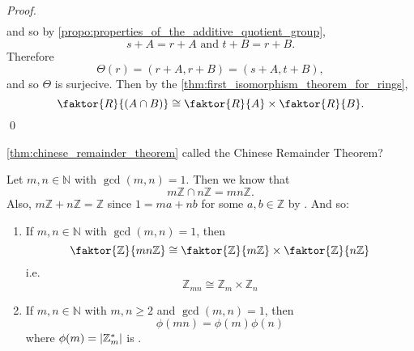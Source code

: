 \begin{proof}
\begin{align*}
  \end{align*}
  and so by \cref{propo:properties_of_the_additive_quotient_group},
  \begin{equation*}
    s + A = r + A \text{ and } t + B = r + B.
  \end{equation*}
  Therefore
  \begin{equation*}
    \Theta(r) = (r + A, r + B) = (s + A, t + B),
  \end{equation*}
  and so $\Theta$ is surjecive. Then by the \cref{thm:first_isomorphism_theorem_for_rings},
  \begin{equation*}
    \faktor{R}{(A \cap B)} \cong \faktor{R}{A} \times \faktor{R}{B}.
  \end{equation*}\qed
\end{proof}

 \cref{thm:chinese_remainder_theorem} called the Chinese Remainder Theorem?

Let $m, n \in \mathbb{N}$ with $\gcd(m, n) = 1$. Then we know that
\begin{equation*}
  m \mathbb{Z} \cap n \mathbb{Z} = mn \mathbb{Z}.
\end{equation*}
Also, $m \mathbb{Z} + n \mathbb{Z} = \mathbb{Z}$ since $1 = ma + nb$ for some $a, b \in \mathbb{Z}$ by . And so:

\begin{crly}
\label{crly:why_crt}
  \begin{enumerate}
    \item If $m, n \in \mathbb{N}$ with $\gcd(m, n) = 1$, then
      \begin{equation*}
        \faktor{\mathbb{Z}}{mn \mathbb{Z}} \cong \faktor{\mathbb{Z}}{m \mathbb{Z}} \times \faktor{\mathbb{Z}}{n \mathbb{Z}}
      \end{equation*}
      i.e.
      \begin{equation*}
        \mathbb{Z}_{mn} \cong \mathbb{Z}_m \times \mathbb{Z}_n
      \end{equation*}

    \item If $m, n \in \mathbb{N}$ with $m, n \geq 2$ and $\gcd(m, n) = 1$, then
      \begin{equation*}
        \phi(mn) = \phi(m)\phi(n)
      \end{equation*}
      where $\phi(m) = \left|\mathbb{Z}_m^*\right|$ is .
  \end{enumerate}
\end{crly}

